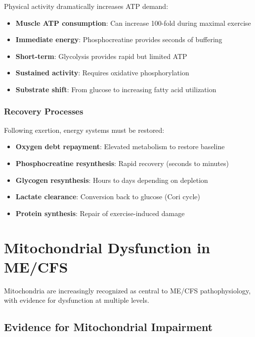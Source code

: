 Physical activity dramatically increases ATP demand:

\begin{itemize}
    \item \textbf{Muscle ATP consumption}: Can increase 100-fold during maximal exercise
    \item \textbf{Immediate energy}: Phosphocreatine provides seconds of buffering
    \item \textbf{Short-term}: Glycolysis provides rapid but limited ATP
    \item \textbf{Sustained activity}: Requires oxidative phosphorylation
    \item \textbf{Substrate shift}: From glucose to increasing fatty acid utilization
\end{itemize}

\subsubsection{Recovery Processes}

Following exertion, energy systems must be restored:

\begin{itemize}
    \item \textbf{Oxygen debt repayment}: Elevated metabolism to restore baseline
    \item \textbf{Phosphocreatine resynthesis}: Rapid recovery (seconds to minutes)
    \item \textbf{Glycogen resynthesis}: Hours to days depending on depletion
    \item \textbf{Lactate clearance}: Conversion back to glucose (Cori cycle)
    \item \textbf{Protein synthesis}: Repair of exercise-induced damage
\end{itemize}

\section{Mitochondrial Dysfunction in ME/CFS}
\label{sec:mitochondrial-dysfunction}

Mitochondria are increasingly recognized as central to ME/CFS pathophysiology, with evidence for dysfunction at multiple levels.

\subsection{Evidence for Mitochondrial Impairment}
\label{sec:mito-evidence}

